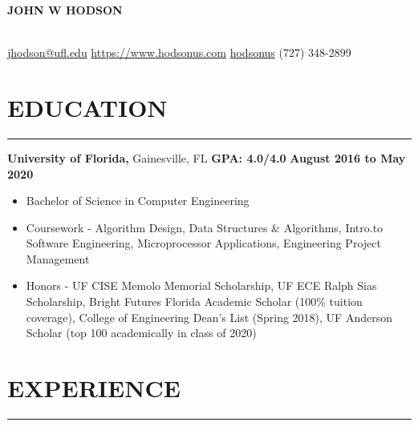 \documentclass[11pt]{article} %
\begin{document}
	
	\noindent\centerline{ \huge\textbf{JOHN W HODSON}}\\
	
	\noindent\Email\space\href{mailto:jhodson@ufl.edu}{jhodson@ufl.edu} \hspace*{\fill} \ComputerMouse \space \href{https://www.hodsonus.com}{https://www.hodsonus.com} \hspace*{\fill} \faGithub \space \href{https://github.com/hodsonus}{hodsonus} \hspace*{\fill} \Mobilefone \space (727) 348-2899\\
	
	\section*{EDUCATION}
		\hrule \relax
		\vspace{.4cm}
		
		\noindent \textbf{University of Florida,} Gainesville, FL
		\hfill\textbf{GPA: 4.0/4.0}
		\hfill\textbf{August 2016 to May 2020}
		
		\begin{itemize}[noitemsep,nolistsep, label = {-}]
			\item Bachelor of Science in Computer Engineering
			\item Coursework - Algorithm Design, Data Structures \& Algorithms, Intro.\@ to Software Engineering, Microprocessor Applications, Engineering Project Management
			\item Honors - UF CISE Memolo Memorial Scholarship, UF ECE Ralph Sias Scholarship, Bright Futures Florida Academic Scholar (100\% tuition coverage), College of Engineering Dean\rq s List (Spring 2018), UF Anderson Scholar (top 100 academically in class of 2020)
		\end{itemize}
		
		\vspace{.1cm}
	
	\section*{EXPERIENCE}
		\hrule \relax
		\vspace{.4cm}
		
\end{document}

